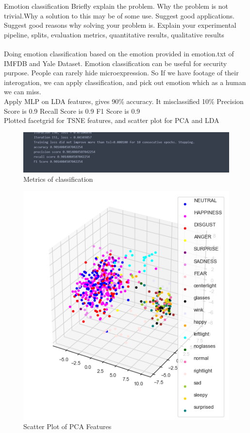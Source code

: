 \documentclass[12pt]{article}
\newenvironment{problem}[2][Problem]{\begin{trivlist}
\item[\hskip \labelsep {\bfseries #1}\hskip \labelsep {\bfseries #2.}]}{\end{trivlist}}
\begin{document}
\begin{problem}{4}
Emotion classification
Briefly explain the problem. Why the problem is not
trivial.Why a solution to this may be of some use. Suggest
good applications. Suggest good reasons why solving
your problem is. Explain your experimental pipeline, splits, evaluation metrics, quantitative results, qualitative results
\\
\\
 Doing emotion classification based on the emotion provided in emotion.txt of IMFDB and Yale Dataset.
Emotion classification can be useful for security purpose. People can rarely hide microexpression. So If we have footage of their interogation, we can apply classification, and pick out emotion which as a human we can miss.
\\ Apply MLP on LDA features, gives 90\% accuracy. It misclassified 10\%  
Precision Score is 0.9 Recall Score is 0.9
F1 Score is 0.9
\\ Plotted facetgrid for TSNE features, and scatter plot for PCA and LDA



\begin{figure}[H]
	\centering		\includegraphics[width=16cm]{emotion_classification_accuracy.png}
	\caption{Metrics of classification}
\end{figure}


\begin{figure}[H]
	\centering		\includegraphics[width=16cm]{Scatter_Plot_of_pca.png}
	\caption{Scatter Plot of PCA Features}
\end{figure}



\end{problem}
\end{document}
